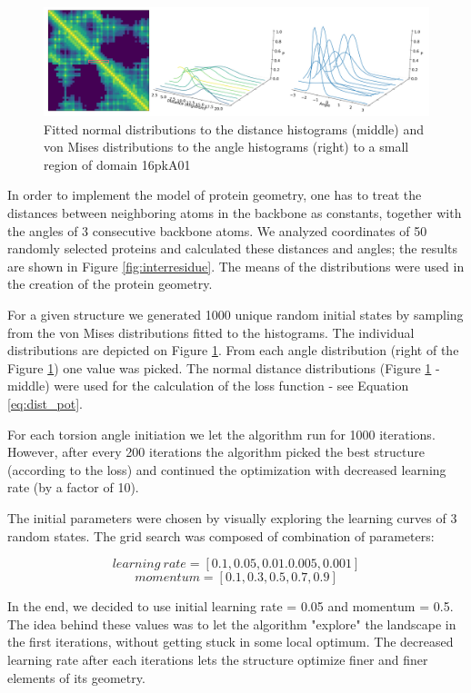 \begin{figure}
    \centering
    \includegraphics[width=\linewidth]{imgs_tomas/histograms2.png}
    \caption{Fitted normal distributions to the distance histograms (middle) and von Mises distributions to the angle histograms (right) to a small region of domain 16pkA01}
    \label{fig:distributions}
\end{figure}

In order to implement the model of protein geometry, one has to treat the distances between neighboring atoms in the backbone as constants, together with the angles of 3 consecutive backbone atoms. We analyzed coordinates of 50 randomly selected proteins and calculated these distances and angles; the results are shown in Figure \ref{fig:interresidue}. The means of the distributions were used in the creation of the protein geometry.

For a given structure we generated 1000 unique random initial states by sampling from the von Mises distributions fitted to the histograms. The individual distributions are depicted on Figure \ref{fig:distributions}. From each angle distribution (right of the Figure \ref{fig:distributions}) one value was picked. The normal distance distributions (Figure \ref{fig:distributions} - middle) were used for the calculation of the loss function - see Equation \ref{eq:dist_pot}.

For each torsion angle initiation we let the algorithm run for 1000 iterations. However, after every 200 iterations the algorithm picked the best structure (according to the loss) and continued the optimization with decreased learning rate (by a factor of 10).

The initial parameters were chosen by visually exploring the learning curves of 3 random states. The grid search was composed of combination of parameters:

$$learning~rate = [0.1, 0.05, 0.01. 0.005, 0.001]$$
$$momentum = [0.1, 0.3, 0.5, 0.7, 0.9]$$

In the end, we decided to use initial learning rate = 0.05 and momentum = 0.5. The idea behind these values was to let the algorithm "explore" the landscape in the first iterations, without getting stuck in some local optimum. The decreased learning rate after each iterations lets the structure optimize finer and finer elements of its geometry.

